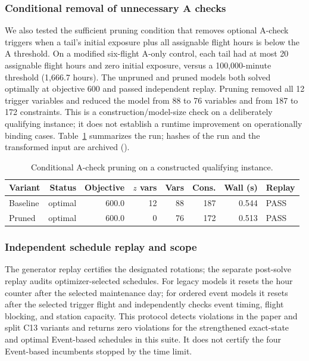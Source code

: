 \subsubsection{Conditional removal of unnecessary A checks}

We also tested the sufficient pruning condition that removes optional A-check
triggers when a tail's initial exposure plus all assignable flight hours is
below the A threshold. On a modified six-flight A-only control, each tail had
at most 20 assignable flight hours and zero initial exposure, versus a
100{,}000-minute threshold (1{,}666.7 hours). The unpruned and pruned models
both solved optimally at objective 600 and passed independent replay. Pruning
removed all 12 trigger variables and reduced the model from 88 to 76 variables
and from 187 to 172 constraints. This is a construction/model-size check on a
deliberately qualifying instance; it does not establish a runtime improvement
on operationally binding cases. Table~\ref{tab:a_check_pruning} summarizes the
run; hashes of the run and the transformed input are archived
().

\begin{table}[t]
\centering\small
\caption{Conditional A-check pruning on a constructed qualifying instance.}
\label{tab:a_check_pruning}
\begin{tabular}{lrrrrrrl}
\toprule
Variant & Status & Objective & $z$ vars & Vars & Cons. & Wall (s) & Replay \\
\midrule
Baseline & optimal & 600.0 & 12 & 88 & 187 & 0.544 & PASS \\
Pruned & optimal & 600.0 & 0 & 76 & 172 & 0.513 & PASS \\
\bottomrule
\end{tabular}
\end{table}

\subsubsection{Independent schedule replay and scope}

The generator replay certifies the designated rotations; the separate
post-solve replay audits optimizer-selected schedules. For legacy models it
resets the hour counter after the selected maintenance day; for ordered event
models it resets after the selected trigger flight and independently checks
event timing, flight blocking, and station capacity. This protocol detects
violations in the paper and split C13 variants and returns zero violations for
the strengthened exact-state and optimal Event-based schedules in this suite.
It does not certify the four Event-based incumbents stopped by the time limit.

